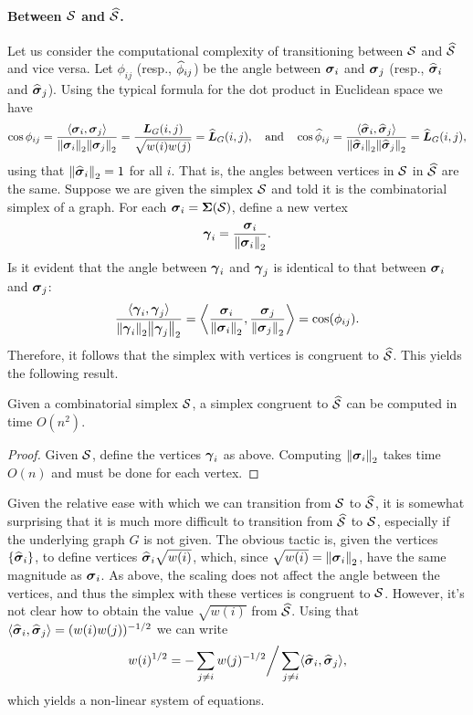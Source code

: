 \paragraph{Between \texorpdfstring{$\mathcal{S}$}{the combinatorial} and \texorpdfstring{$\widehat{\mathcal{S}}$}{normalized simplex}.}
Let us consider the computational complexity of transitioning between $\mathcal{S}$ and $\widehat{\mathcal{S}}$ and vice versa. Let $\phi_{ij}$ (resp., $\widehat{\phi}_{ij}$) be the angle between $\vb*{\sigma}_i$ and $\vb*{\sigma}_j$ (resp., $\widehat{\vb*{\sigma}}_i$ and $\widehat{\vb*{\sigma}}_j$). Using the typical formula for the dot product in Euclidean space we have
\begin{equation*}
\cos\phi_{ij} = \frac{\langle \vb*{\sigma}_i,\vb*{\sigma}_j\rangle }{\norm{\vb*{\sigma}_i}_2\norm{\vb*{\sigma}_j}_2} = \frac{\vb*{L}_G(i,j)}{\sqrt{w(i)w(j)}} = \widehat{\vb*{L}}_G(i,j), \quad\text{and}\quad \cos\widehat{\phi}_{ij} = \frac{\langle \widehat{\vb*{\sigma}}_i,\widehat{\vb*{\sigma}}_j\rangle }{\norm{\widehat{\vb*{\sigma}}_i}_2\norm{\widehat{\vb*{\sigma}}_j}_2} = \widehat{\vb*{L}}_G(i,j),
\end{equation*}
using that $\norm{\widehat{\vb*{\sigma}}_i}_2=1$ for all $i$. 
That is, the angles between vertices in $\mathcal{S}$ in $\widehat{\mathcal{S}}$ are the same. Suppose we are given the simplex $\mathcal{S}$ and told it is the combinatorial simplex of a graph. For each $\vb*{\sigma}_i = \boldsymbol{\Sigma}(\mathcal{S})$, define a new vertex 
\[\vb*{\gamma}_i = \frac{\vb*{\sigma}_i}{\norm{\vb*{\sigma}_i}_2}.\]
Is it evident that the angle between $\vb*{\gamma}_i$ and $\vb*{\gamma}_j$ is identical to that between $\vb*{\sigma}_i$ and $\vb*{\sigma}_j$: 
\begin{equation*}
\frac{\langle \vb*{\gamma}_i,\vb*{\gamma}_j\rangle}{\norm{\vb*{\gamma}_i}_2\norm{\vb*{\gamma}_j}_2} = \bigg\langle \frac{\vb*{\sigma}_i}{\norm{\vb*{\sigma}_i}_2},\frac{\vb*{\sigma}_j}{\norm{\vb*{\sigma}_j}_2}\bigg\rangle = \cos(\phi_{ij}).
\end{equation*}
Therefore, it follows that the simplex with vertices is congruent  to $\widehat{\mathcal{S}}$. This yields the following result. 

\begin{lemma}
	Given a combinatorial simplex $\mathcal{S}$, a simplex congruent to $\widehat{\mathcal{S}}$ can be computed in time $O(n^2)$. 
\end{lemma}
\begin{proof}
	Given $\mathcal{S}$, define the vertices $\vb*{\gamma}_i$ as above. Computing $\norm{\vb*{\sigma}_i}_2$ takes time $O(n)$ and must be done for each vertex. 
\end{proof}

Given the relative ease with which we can transition from $\mathcal{S}$ to $\widehat{\mathcal{S}}$, it is somewhat surprising that it is much more difficult to transition from $\widehat{\mathcal{S}}$ to  $\mathcal{S}$, especially if the underlying graph $G$ is not given. The obvious tactic is, given the vertices $\{\widehat{\vb*{\sigma}}_i\}$, to define vertices $\widehat{\vb*{\sigma}}_i \sqrt{w(i)}$, which, since $\sqrt{w(i)}=\norm{\vb*{\sigma}_i}_2$, have the same magnitude as $\vb*{\sigma}_i$. As above, the scaling does not affect the angle between the vertices, and thus the simplex with these vertices is congruent to $\mathcal{S}$. However, it's not clear how to obtain the value $\sqrt{w(i)}$ from $\widehat{\mathcal{S}}$. Using that $\langle \widehat{\vb*{\sigma}}_i,\widehat{\vb*{\sigma}}_j\rangle =(w(i)w(j))^{-1/2}$ we can write 
\[w(i)^{1/2} = -\sum_{j\neq i}w(j)^{-1/2} \bigg/ \sum_{j\neq i}\langle \widehat{\vb*{\sigma}}_i,\widehat{\vb*{\sigma}}_j\rangle,\]
which yields a non-linear system of equations. 

